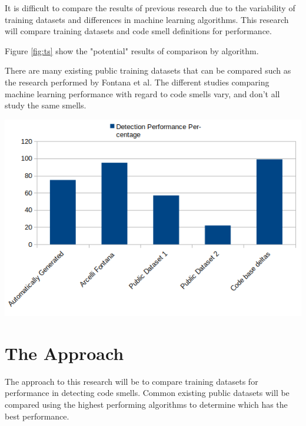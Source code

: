 \documentclass[conference]{IEEEtran}
\begin{document}
It is difficult to compare the results of previous research due to the variability of training datasets and differences in machine learning algorithms.
This research will compare training datasets and code smell definitions for performance.

Figure \ref{fig:ts} show the "potential" results of comparison by algorithm. 

There are many existing public training datasets that can be compared such as the research performed by Fontana et al.\cite{arcelli_fontana_comparing_2016} 
The different studies comparing machine learning performance with regard to code smells vary, and don't all study the same smells.

\begin{center}
\includegraphics[width=\columnwidth]{teaser.png}
\label{fig:ts}%
\end{center}


\section{The Approach}
The approach to this research will be to compare training datasets for performance in detecting code smells.
Common existing public datasets will be compared using the highest performing algorithms to determine which has the best performance.
\end{document}
